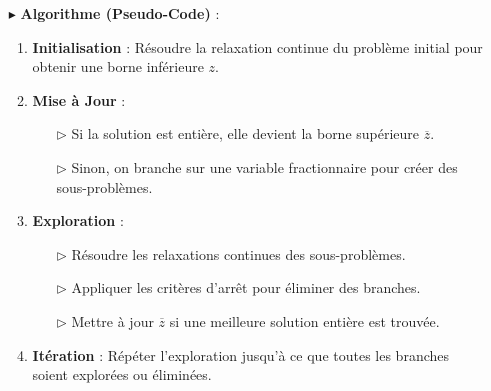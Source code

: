 \documentclass{report}
\begin{document}
\begin{multicols*}{2}
\begin{itemize}
    \item[$\blacktriangleright$] \textbf{Algorithme (Pseudo-Code)} :
    \begin{enumerate}
        \item \textbf{Initialisation} : Résoudre la relaxation continue du problème initial pour obtenir une borne inférieure \( z \).
        \item \textbf{Mise à Jour} :
        \begin{itemize}
            \item[$\rhd$] Si la solution est entière, elle devient la borne supérieure \( \overline{z} \).
            \item[$\rhd$] Sinon, on branche sur une variable fractionnaire pour créer des sous-problèmes.
        \end{itemize}
        \item \textbf{Exploration} :
        \begin{itemize}
            \item[$\rhd$] Résoudre les relaxations continues des sous-problèmes.
            \item[$\rhd$] Appliquer les critères d'arrêt pour éliminer des branches.
            \item[$\rhd$] Mettre à jour \( \overline{z} \) si une meilleure solution entière est trouvée.
        \end{itemize}
        \item \textbf{Itération} : Répéter l'exploration jusqu'à ce que toutes les branches soient explorées ou éliminées.
    \end{enumerate}


\end{itemize}
\end{multicols*}
\end{document}
